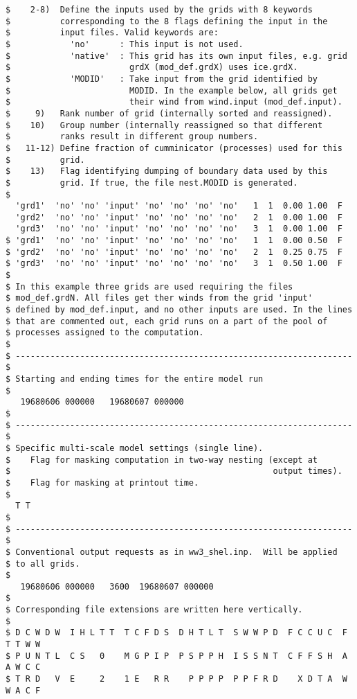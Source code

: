 \begin{verbatim}
$    2-8)  Define the inputs used by the grids with 8 keywords 
$          corresponding to the 8 flags defining the input in the
$          input files. Valid keywords are:
$            'no'      : This input is not used.
$            'native'  : This grid has its own input files, e.g. grid
$                        grdX (mod_def.grdX) uses ice.grdX.
$            'MODID'   : Take input from the grid identified by 
$                        MODID. In the example below, all grids get
$                        their wind from wind.input (mod_def.input).
$     9)   Rank number of grid (internally sorted and reassigned).
$    10)   Group number (internally reassigned so that different
$          ranks result in different group numbers.
$   11-12) Define fraction of cumminicator (processes) used for this
$          grid.
$    13)   Flag identifying dumping of boundary data used by this
$          grid. If true, the file nest.MODID is generated.
$
  'grd1'  'no' 'no' 'input' 'no' 'no' 'no' 'no'   1  1  0.00 1.00  F
  'grd2'  'no' 'no' 'input' 'no' 'no' 'no' 'no'   2  1  0.00 1.00  F
  'grd3'  'no' 'no' 'input' 'no' 'no' 'no' 'no'   3  1  0.00 1.00  F
$ 'grd1'  'no' 'no' 'input' 'no' 'no' 'no' 'no'   1  1  0.00 0.50  F
$ 'grd2'  'no' 'no' 'input' 'no' 'no' 'no' 'no'   2  1  0.25 0.75  F
$ 'grd3'  'no' 'no' 'input' 'no' 'no' 'no' 'no'   3  1  0.50 1.00  F
$
$ In this example three grids are used requiring the files
$ mod_def.grdN. All files get ther winds from the grid 'input'
$ defined by mod_def.input, and no other inputs are used. In the lines
$ that are commented out, each grid runs on a part of the pool of
$ processes assigned to the computation.
$
$ -------------------------------------------------------------------- $
$ Starting and ending times for the entire model run
$
   19680606 000000   19680607 000000
$
$ -------------------------------------------------------------------- $
$ Specific multi-scale model settings (single line).
$    Flag for masking computation in two-way nesting (except at 
$                                                     output times).
$    Flag for masking at printout time.
$
  T T
$
$ -------------------------------------------------------------------- $
$ Conventional output requests as in ww3_shel.inp.  Will be applied
$ to all grids.
$
   19680606 000000   3600  19680607 000000
$
$ Corresponding file extensions are written here vertically.  
$
$ D C W D W  I H L T T  T C F D S  D H T L T  S W W P D  F C C U C  F T T W W  
$ P U N T L  C S   0    M G P I P  P S P P H  I S S N T  C F F S H  A A W C C  
$ T R D   V  E     2    1 E   R R    P P P P  P P F R D    X D T A  W W A C F 

\end{verbatim}
